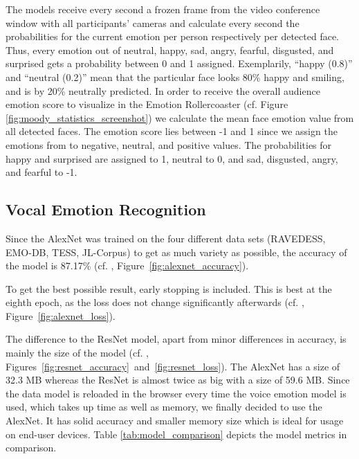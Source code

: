 The models receive every second a frozen frame from the video conference window with all participants' cameras and calculate every second the probabilities for the current  emotion per person respectively per detected face. Thus, every emotion out of neutral, happy, sad, angry, fearful, disgusted, and surprised gets a probability between 0 and 1 assigned. Exemplarily, ``happy (0.8)'' and ``neutral (0.2)'' mean that the particular face looks 80\% happy and smiling, and is by 20\% neutrally predicted. In order to receive the overall audience emotion score to visualize in the Emotion Rollercoaster (cf. Figure \ref{fig:moody_statistics_screenshot}) we calculate the mean face emotion value from all detected faces. The emotion score lies between -1 and 1 since we assign the emotions from  to negative, neutral, and positive values. The probabilities for happy and surprised are assigned to 1, neutral to 0, and sad, disgusted, angry, and fearful to -1.

\subsection{Vocal Emotion Recognition}
\label{subsec:results_vocal_emotion_recognition}
Since the AlexNet was trained on the four different data sets (RAVEDESS, EMO-DB, TESS, JL-Corpus) to get as much variety as possible, the accuracy of the model is 87.17\% (cf. , Figure~\ref{fig:alexnet_accuracy}). 

To get the best possible result, early stopping is included. This is best at the eighth epoch, as the loss does not change significantly afterwards (cf. , Figure~\ref{fig:alexnet_loss}).

The difference to the ResNet model, apart from minor differences in accuracy, is mainly the size of the model (cf. , Figures~\ref{fig:resnet_accuracy}~and~\ref{fig:resnet_loss}). The AlexNet has a size of 32.3 MB whereas the ResNet is almost twice as big with a size of 59.6 MB. Since the data model is reloaded in the browser every time the voice emotion model is used, which takes up time as well as memory, we finally decided to use the AlexNet. It has solid accuracy and smaller memory size which is ideal for usage on end-user devices. Table \ref{tab:model_comparison} depicts the model metrics in comparison.

